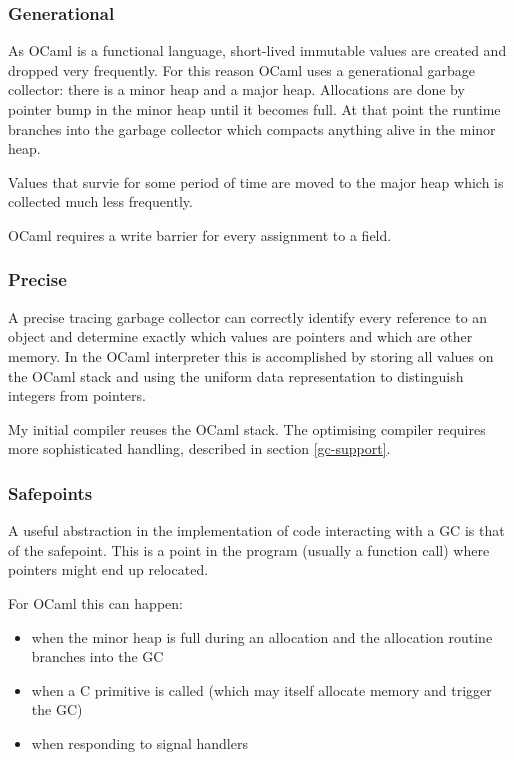 \subsubsection{Generational}

As OCaml is a functional language, short-lived immutable values are created and dropped very
frequently. For this reason OCaml uses a generational garbage collector: there is a minor heap and
a major heap. Allocations are done by pointer bump in the minor heap
until it becomes full. At that point the runtime branches into the garbage collector which compacts
anything alive in the minor heap.

Values that survie for some period of time are moved to the major heap which is collected much less
frequently.

OCaml requires a write barrier for every assignment to a field.

\subsubsection{Precise}

A precise tracing garbage collector can correctly identify every reference to an object and
determine exactly which values are pointers and which are other memory. In the OCaml interpreter
this is accomplished by storing all values on the OCaml stack and using the uniform data
representation to distinguish integers from pointers.

My initial compiler reuses the OCaml stack. The optimising compiler requires more sophisticated
handling, described in section \ref{gc-support}.

\subsubsection{Safepoints}

A useful abstraction in the implementation of code interacting with a GC is that of the safepoint.
This is a point in the program (usually a function call) where pointers might end up relocated.

For OCaml this can happen:

\begin{itemize}
    \item when the minor heap is full during an allocation and the allocation routine branches
          into
          the
          GC
    \item when a C primitive is called	(which may itself allocate memory and trigger the
          GC)
    \item when responding to signal handlers
\end{itemize}

